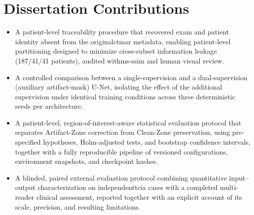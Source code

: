 \section{Dissertation Contributions}
\begin{itemize}
    \item A patient-level traceability procedure that recovered exam and patient identity absent from the original\acrshort{ctmar} metadata, enabling patient-level partitioning designed to minimize cross-subset information leakage (187/41/41 patients), audited with\acrshort{ms-ssim} and human visual review.
    \item A controlled comparison between a single-supervision and a dual-supervision (auxiliary artifact-mask) U-Net, isolating the effect of the additional supervision under identical training conditions across three deterministic seeds per architecture.
    \item A patient-level, region-of-interest-aware statistical evaluation protocol that separates Artifact-Zone correction from Clean-Zone preservation, using pre-specified hypotheses, Holm-adjusted tests, and bootstrap confidence intervals, together with a fully reproducible pipeline of versioned configurations, environment snapshots, and checkpoint hashes.
    \item A blinded, paired external evaluation protocol combining quantitative input--output characterization on independent\acrshort{tcia} cases with a completed multi-reader clinical assessment, reported together with an explicit account of its scale, precision, and resulting limitations.
\end{itemize}

